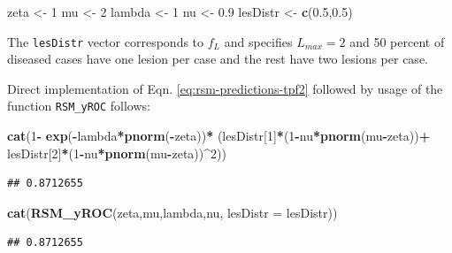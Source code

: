 \documentclass[
]{book}
\newenvironment{Shaded}{\begin{snugshade}}{\end{snugshade}}
\newcommand{\DataTypeTok}[1]{\textcolor[rgb]{0.13,0.29,0.53}{#1}}
\newcommand{\DecValTok}[1]{\textcolor[rgb]{0.00,0.00,0.81}{#1}}
\newcommand{\FloatTok}[1]{\textcolor[rgb]{0.00,0.00,0.81}{#1}}
\newcommand{\KeywordTok}[1]{\textcolor[rgb]{0.13,0.29,0.53}{\textbf{#1}}}
\newcommand{\NormalTok}[1]{#1}
\newcommand{\OperatorTok}[1]{\textcolor[rgb]{0.81,0.36,0.00}{\textbf{#1}}}
\newcommand{\StringTok}[1]{\textcolor[rgb]{0.31,0.60,0.02}{#1}}
\begin{document}
\begin{Shaded}
\begin{Highlighting}[]
\NormalTok{zeta <-}\StringTok{ }\DecValTok{1}
\NormalTok{mu <-}\StringTok{ }\DecValTok{2}
\NormalTok{lambda <-}\StringTok{ }\DecValTok{1}
\NormalTok{nu <-}\StringTok{ }\FloatTok{0.9}
\NormalTok{lesDistr <-}\StringTok{ }\KeywordTok{c}\NormalTok{(}\FloatTok{0.5}\NormalTok{,}\FloatTok{0.5}\NormalTok{)}
\end{Highlighting}
\end{Shaded}

The \texttt{lesDistr} vector corresponds to \(f_L\) and specifies \(L_{max} = 2\) and 50 percent of diseased cases have one lesion per case and the rest have two lesions per case.

Direct implementation of Eqn. \eqref{eq:rsm-predictions-tpf2} followed by usage of the function \texttt{RSM\_yROC} follows:

\begin{Shaded}
\begin{Highlighting}[]
\KeywordTok{cat}\NormalTok{(}\DecValTok{1}\OperatorTok{-}
\KeywordTok{exp}\NormalTok{(}\OperatorTok{-}\NormalTok{lambda}\OperatorTok{*}\KeywordTok{pnorm}\NormalTok{(}\OperatorTok{-}\NormalTok{zeta))}\OperatorTok{*}
\NormalTok{(lesDistr[}\DecValTok{1}\NormalTok{]}\OperatorTok{*}\NormalTok{(}\DecValTok{1}\OperatorTok{-}\NormalTok{nu}\OperatorTok{*}\KeywordTok{pnorm}\NormalTok{(mu}\OperatorTok{-}\NormalTok{zeta))}\OperatorTok{+}
\NormalTok{lesDistr[}\DecValTok{2}\NormalTok{]}\OperatorTok{*}\NormalTok{(}\DecValTok{1}\OperatorTok{-}\NormalTok{nu}\OperatorTok{*}\KeywordTok{pnorm}\NormalTok{(mu}\OperatorTok{-}\NormalTok{zeta))}\OperatorTok{^}\DecValTok{2}\NormalTok{))}
\end{Highlighting}
\end{Shaded}

\begin{verbatim}
## 0.8712655
\end{verbatim}

\begin{Shaded}
\begin{Highlighting}[]
\KeywordTok{cat}\NormalTok{(}\KeywordTok{RSM_yROC}\NormalTok{(zeta,mu,lambda,nu, }\DataTypeTok{lesDistr =}\NormalTok{ lesDistr))}
\end{Highlighting}
\end{Shaded}

\begin{verbatim}
## 0.8712655
\end{verbatim}
\end{document}
